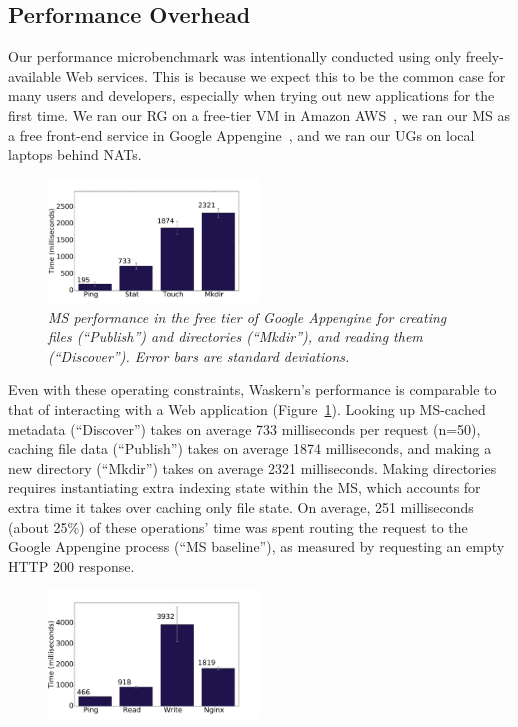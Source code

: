 \subsection{Performance Overhead}

Our performance microbenchmark was intentionally conducted using only
freely-available Web services.  This is because we expect this to be the common
case for many users and developers, especially when trying out new applications
for the first time.  We ran our RG on a free-tier VM in Amazon
AWS~\cite{amazon-aws}, we ran our MS as a free front-end service in Google
Appengine~\cite{google-appengine}, and we ran our UGs on local laptops behind
NATs.

\begin{figure}[t!]
\centering
\includegraphics[width=0.5\textwidth]{figures/ms-performance}
\caption{\it MS performance in the free tier of Google Appengine for creating
   files (``Publish'') and directories (``Mkdir''), and reading them
   (``Discover''). Error bars are standard deviations.}
\label{fig:ms-performance}
\end{figure}

Even with these operating constraints, Waskern's performance is comparable to
that of interacting with a Web application (Figure~\ref{fig:ms-performance}).
Looking up MS-cached metadata
(``Discover'') takes on average 733 milliseconds per request (n=50), caching
file data (``Publish'') takes on average 1874 milliseconds, and making a new
directory (``Mkdir'') takes on average 2321 milliseconds.  Making directories
requires instantiating extra indexing state within the MS, which accounts
for extra time it takes over caching only file state.  On average, 251
milliseconds (about 25\%) of these operations' time was spent routing the request to the Google
Appengine process (``MS baseline''), as measured by requesting an empty HTTP 200
response.

\begin{figure}[t!]
\centering
\includegraphics[width=0.5\textwidth]{figures/data-performance}
\caption{\it  }
\label{fig:data-performance}
\end{figure}

